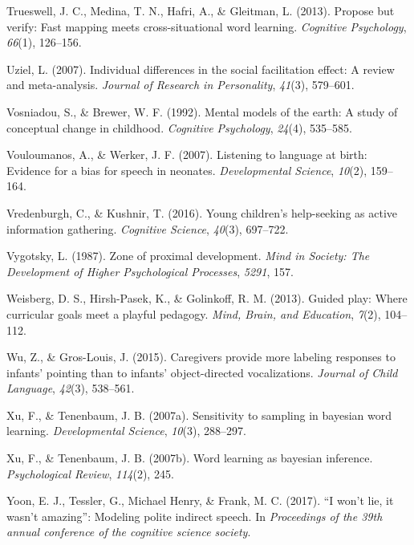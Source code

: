 \documentclass[english,floatsintext,man]{apa6}
\theoremstyle{definition}
\theoremstyle{definition}
\theoremstyle{definition}
\theoremstyle{remark}
\begin{document}
\hypertarget{ref-trueswell2013propose}{}
Trueswell, J. C., Medina, T. N., Hafri, A., \& Gleitman, L. (2013).
Propose but verify: Fast mapping meets cross-situational word learning.
\emph{Cognitive Psychology}, \emph{66}(1), 126--156.

\hypertarget{ref-uziel2007individual}{}
Uziel, L. (2007). Individual differences in the social facilitation
effect: A review and meta-analysis. \emph{Journal of Research in
Personality}, \emph{41}(3), 579--601.

\hypertarget{ref-vosniadou1992mental}{}
Vosniadou, S., \& Brewer, W. F. (1992). Mental models of the earth: A
study of conceptual change in childhood. \emph{Cognitive Psychology},
\emph{24}(4), 535--585.

\hypertarget{ref-vouloumanos2007listening}{}
Vouloumanos, A., \& Werker, J. F. (2007). Listening to language at
birth: Evidence for a bias for speech in neonates. \emph{Developmental
Science}, \emph{10}(2), 159--164.

\hypertarget{ref-vredenburgh2016young}{}
Vredenburgh, C., \& Kushnir, T. (2016). Young children's help-seeking as
active information gathering. \emph{Cognitive Science}, \emph{40}(3),
697--722.

\hypertarget{ref-vygotsky1987zone}{}
Vygotsky, L. (1987). Zone of proximal development. \emph{Mind in
Society: The Development of Higher Psychological Processes},
\emph{5291}, 157.

\hypertarget{ref-weisberg2013guided}{}
Weisberg, D. S., Hirsh-Pasek, K., \& Golinkoff, R. M. (2013). Guided
play: Where curricular goals meet a playful pedagogy. \emph{Mind, Brain,
and Education}, \emph{7}(2), 104--112.

\hypertarget{ref-wu2015caregivers}{}
Wu, Z., \& Gros-Louis, J. (2015). Caregivers provide more labeling
responses to infants' pointing than to infants' object-directed
vocalizations. \emph{Journal of Child Language}, \emph{42}(3), 538--561.

\hypertarget{ref-xu2007sampling}{}
Xu, F., \& Tenenbaum, J. B. (2007a). Sensitivity to sampling in bayesian
word learning. \emph{Developmental Science}, \emph{10}(3), 288--297.

\hypertarget{ref-xu2007word}{}
Xu, F., \& Tenenbaum, J. B. (2007b). Word learning as bayesian
inference. \emph{Psychological Review}, \emph{114}(2), 245.

\hypertarget{ref-yoonwon}{}
Yoon, E. J., Tessler, G., Michael Henry, \& Frank, M. C. (2017). ``I
won't lie, it wasn't amazing'': Modeling polite indirect speech. In
\emph{Proceedings of the 39th annual conference of the cognitive science
society}.
\end{document}
